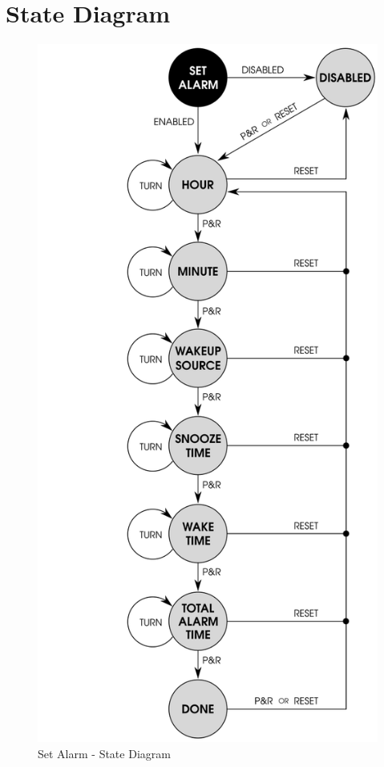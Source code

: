\pagebreak
\section{State Diagram} \label{Set Alarm State Diagram}

\begin{figure}[H]
  \centering
  \includegraphics{images/set_alarm_state_diagram.png}
  \caption{Set Alarm - State Diagram}
\end{figure}
